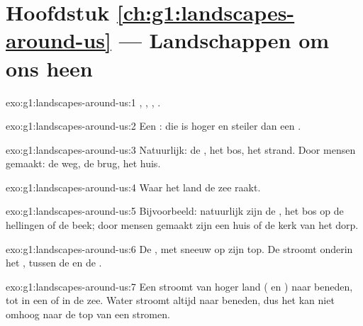 \section*{Hoofdstuk \ref{ch:g1:landscapes-around-us} --- Landschappen om ons heen}

\begin{solution}{exo:g1:landscapes-around-us:1}
, , , .
\end{solution}

\begin{solution}{exo:g1:landscapes-around-us:2}
Een : die is hoger en steiler dan een .
\end{solution}

\begin{solution}{exo:g1:landscapes-around-us:3}
Natuurlijk: de , het bos, het strand. Door mensen gemaakt: de weg, de brug, het
huis.
\end{solution}

\begin{solution}{exo:g1:landscapes-around-us:4}
Waar het land de zee raakt.
\end{solution}

\begin{solution}{exo:g1:landscapes-around-us:5}
Bijvoorbeeld: natuurlijk zijn de , het bos op de hellingen of de
beek; door mensen gemaakt zijn een huis of de kerk van het dorp.
\end{solution}

\begin{solution}{exo:g1:landscapes-around-us:6}
De , met sneeuw op zijn top. De  stroomt onderin het , tussen
de  en de .
\end{solution}

\begin{solution}{exo:g1:landscapes-around-us:7}
Een  stroomt van hoger land ( en ) naar beneden, tot in
een  of in de zee. Water stroomt altijd naar beneden, dus het kan niet
omhoog naar de top van een  stromen.
\end{solution}

